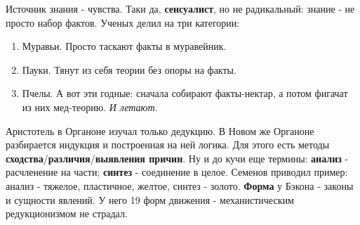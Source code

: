 Источник знания - чувства. Таки да, \textbf{сенсуалист}, но не радикальный: знание - не просто набор фактов. Ученых делил на три категории:
\begin{enumerate}
\item Муравьи. Просто таскают факты в муравейник.
\item Пауки. Тянут из себя теории без опоры на факты.
\item Пчелы. А вот эти годные: сначала собирают факты-нектар, а потом фигачат из них мед-теорию. \textit{И летают.}
\end{enumerate}

Аристотель в Органоне изучал только дедукцию. В Новом же Органоне разбирается индукция и построенная на ней логика. Для этого есть методы \textbf{сходства}/\textbf{различия}/\textbf{выявления причин}. Ну и до кучи еще термины: \textbf{анализ} - расчленение на части; \textbf{синтез} - соединение в целое. Семенов приводил пример: анализ - тяжелое, пластичное, желтое, синтез - золото. \textbf{Форма} у Бэкона - законы и сущности явлений. У него 19 форм движения - механистическим редукционизмом не страдал.


